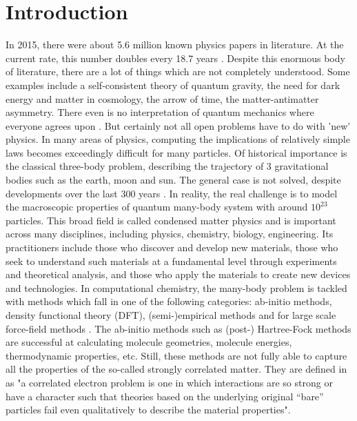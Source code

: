 
\section{Introduction}

In 2015, there were about 5.6 million known physics papers in literature. At the current rate, this number doubles every 18.7 years \cite{Sinatra2015}. Despite this enormous body of literature, there are a lot of things which are not completely understood. Some examples include a self-consistent theory of quantum gravity, the need for dark energy and matter in cosmology, the arrow of time, the matter-antimatter asymmetry. There even is no interpretation of quantum mechanics where everyone agrees upon \cite{anssonJohanDivisionofPhysicsLuleaUniversityofTechnologySE-97187Lulea2015}.
But certainly not all open problems have to do with 'new' physics. In many areas of physics, computing the implications of relatively simple laws becomes exceedingly difficult for many particles. Of historical importance is the classical three-body problem, describing the trajectory of 3 gravitational bodies such as the earth, moon and sun. The general case is not solved, despite developments over the last 300 years \cite{Musielak2014}.
In reality, the real challenge is to model the macroscopic properties of quantum many-body system with around $10^{23}$ particles. This broad field is called condensed matter physics and is important across many disciplines, including physics, chemistry, biology, engineering. Its practitioners include those who discover and develop new materials, those who seek to understand such materials at a fundamental level through experiments and theoretical analysis, and those who apply the materials to create new devices and technologies.  \cite{Mora-Aznar2000}
In computational chemistry, the many-body problem is tackled with methods which fall in one of the following categories: ab-initio methods, density functional theory (DFT), (semi-)empirical methods and for large scale force-field methods \cite{Lewars2011}. The ab-initio methods such as (post-) Hartree-Fock methods are successful at calculating molecule geometries, molecule energies, thermodynamic properties, etc. \cite{Lewars2011}
Still, these methods are not fully able to capture all the properties of the so-called strongly correlated matter. They are defined in \cite{Alexandradinata2020} as "a correlated electron problem is one in which interactions are so strong or have a character such that theories based on the underlying original “bare” particles fail even qualitatively to describe the material properties".
